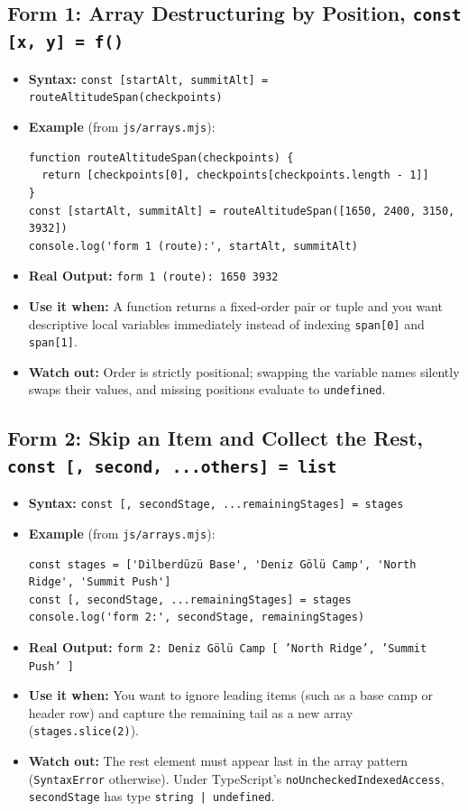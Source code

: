 \documentclass[11pt, a4paper]{article}
\begin{document}
\subsection{Form 1: Array Destructuring by Position, \texttt{const [x, y] = f()}}
\begin{itemize}
  \item \textbf{Syntax:} \texttt{const [startAlt, summitAlt] = routeAltitudeSpan(checkpoints)}
  \item \textbf{Example} (from \texttt{js/arrays.mjs}):
\begin{lstlisting}
function routeAltitudeSpan(checkpoints) {
  return [checkpoints[0], checkpoints[checkpoints.length - 1]]
}
const [startAlt, summitAlt] = routeAltitudeSpan([1650, 2400, 3150, 3932])
console.log('form 1 (route):', startAlt, summitAlt)
\end{lstlisting}
  \item \textbf{Real Output:} \texttt{form 1 (route): 1650 3932}
  \item \textbf{Use it when:} A function returns a fixed-order pair or tuple and you want descriptive local variables immediately instead of indexing \texttt{span[0]} and \texttt{span[1]}.
  \item \textbf{Watch out:} Order is strictly positional; swapping the variable names silently swaps their values, and missing positions evaluate to \texttt{undefined}.
\end{itemize}

\subsection{Form 2: Skip an Item and Collect the Rest, \texttt{const [, second, ...others] = list}}
\begin{itemize}
  \item \textbf{Syntax:} \texttt{const [, secondStage, ...remainingStages] = stages}
  \item \textbf{Example} (from \texttt{js/arrays.mjs}):
\begin{lstlisting}
const stages = ['Dilberdüzü Base', 'Deniz Gölü Camp', 'North Ridge', 'Summit Push']
const [, secondStage, ...remainingStages] = stages
console.log('form 2:', secondStage, remainingStages)
\end{lstlisting}
  \item \textbf{Real Output:} \texttt{form 2: Deniz Gölü Camp [ 'North Ridge', 'Summit Push' ]}
  \item \textbf{Use it when:} You want to ignore leading items (such as a base camp or header row) and capture the remaining tail as a new array (\texttt{stages.slice(2)}).
  \item \textbf{Watch out:} The rest element must appear last in the array pattern (\texttt{SyntaxError} otherwise). Under TypeScript's \texttt{noUncheckedIndexedAccess}, \texttt{secondStage} has type \texttt{string | undefined}.
\end{itemize}
\end{document}

